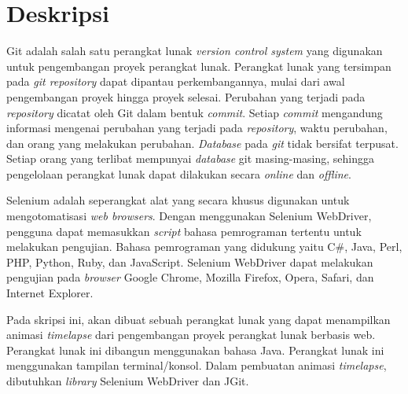 \documentclass[a4paper,twoside]{article}
\begin{document}
\title{\@judultopik}
\author{\nama \textendash \@npm} 

\newcommand{\nama}{Billy Adiwijaya}
\newcommand{\@npm}{2015730053}
\newcommand{\@judultopik}{Pembangkit Timelapse Pengembangan Proyek Perangkat Lunak Berbasis Web} %
\newcommand{\jumpemb}{1} %
\newcommand{\tanggal}{03/09/2018}


\maketitle


\section{Deskripsi}
 Git adalah salah satu perangkat lunak \textit{version control system} yang digunakan untuk pengembangan proyek perangkat lunak. Perangkat lunak yang tersimpan pada \textit{git repository} dapat dipantau perkembangannya, mulai dari awal pengembangan proyek hingga proyek selesai. Perubahan yang terjadi pada \textit{repository} dicatat oleh Git dalam bentuk \textit{commit}. Setiap \textit{commit} mengandung informasi mengenai perubahan yang terjadi pada \textit{repository}, waktu perubahan, dan orang yang melakukan perubahan. \textit{Database} pada \textit{git} tidak bersifat terpusat. Setiap orang yang terlibat mempunyai \textit{database} git masing-masing, sehingga pengelolaan perangkat lunak dapat dilakukan secara \textit{online} dan \textit{offline}. 

Selenium adalah seperangkat alat yang secara khusus digunakan untuk mengotomatisasi \textit{web browsers}. Dengan menggunakan Selenium WebDriver, pengguna dapat memasukkan \textit{script} bahasa pemrograman tertentu untuk melakukan pengujian. Bahasa pemrograman yang didukung yaitu C\#, Java, Perl, PHP, Python, Ruby, dan JavaScript. Selenium WebDriver dapat melakukan pengujian pada \textit{browser} Google Chrome, Mozilla Firefox, Opera, Safari, dan Internet Explorer.  
  
Pada skripsi ini, akan dibuat sebuah perangkat lunak yang dapat menampilkan animasi \textit{timelapse} dari pengembangan proyek perangkat lunak berbasis web. Perangkat lunak ini dibangun menggunakan bahasa Java. Perangkat lunak ini menggunakan tampilan terminal/konsol. Dalam pembuatan animasi \textit{timelapse}, dibutuhkan \textit{library} Selenium WebDriver dan JGit. 
\end{document}
